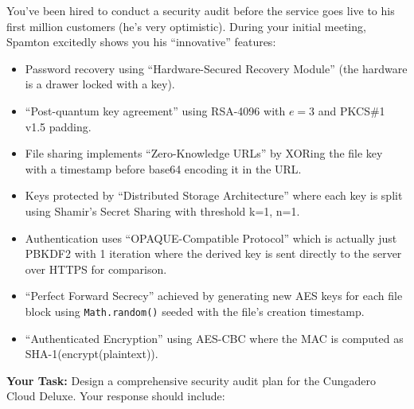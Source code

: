 \documentclass[10pt,a4paper,american]{exam}
\begin{document}
\begin{tcolorbox}[colframe=EarthBrown!30!white,colback=EarthBrown!5!white]
\begin{questions}
		You've been hired to conduct a security audit before the service goes live to his first million customers (he's very optimistic). During your initial meeting, Spamton excitedly shows you his ``innovative'' features:

		\begin{itemize}
			\item Password recovery using ``Hardware-Secured Recovery Module'' (the hardware is a drawer locked with a key).
			\item ``Post-quantum key agreement'' using RSA-4096 with $e = 3$ and PKCS\#1 v1.5 padding.
			\item File sharing implements ``Zero-Knowledge URLs'' by XORing the file key with a timestamp before base64 encoding it in the URL.
			\item Keys protected by ``Distributed Storage Architecture'' where each key is split using Shamir's Secret Sharing with threshold k=1, n=1.
			\item Authentication uses ``OPAQUE-Compatible Protocol'' which is actually just PBKDF2 with 1 iteration where the derived key is sent directly to the server over HTTPS for comparison.
			\item ``Perfect Forward Secrecy'' achieved by generating new AES keys for each file block using \texttt{Math.random()} seeded with the file's creation timestamp.
			\item ``Authenticated Encryption'' using AES-CBC where the MAC is computed as SHA-1(encrypt(plaintext)).
		\end{itemize}

		\textbf{Your Task:} Design a comprehensive security audit plan for the Cungadero Cloud Deluxe. Your response should include:
\end{questions}
\end{tcolorbox}
\end{document}
